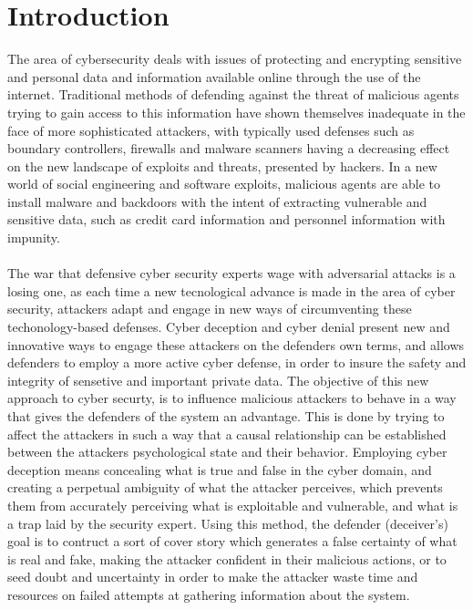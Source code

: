 \section{Introduction}
The area of cybersecurity deals with issues of protecting and encrypting sensitive and personal data and information available online through the use of the internet. Traditional methods of defending against the threat of malicious agents trying to gain access to this information have shown themselves inadequate in the face of more sophisticated attackers, with typically used defenses such as boundary controllers, firewalls and malware scanners having a decreasing effect on the new landscape of exploits and threats, presented by hackers. In a new world of social engineering and software exploits, malicious agents are able to install malware and backdoors with the intent of extracting vulnerable and sensitive data, such as credit card information and personnel information with impunity. \\\\
\noindent
The war that defensive cyber security experts wage with adversarial attacks is a losing one, as each time a new tecnological advance is made in the area of cyber security, attackers adapt and engage in new ways of circumventing these techonology-based defenses. Cyber deception and cyber denial present new and innovative ways to engage these attackers on the defenders own terms, and allows defenders to employ a more active cyber defense, in order to insure the safety and integrity of sensetive and important private data. The objective of this new approach to cyber securty, is to influence malicious attackers to behave in a way that gives the defenders of the system an advantage. This is done by trying to affect the attackers in such a way that a causal relationship can be established between the attackers psychological state and their behavior. Employing cyber deception means concealing what is true and false in the cyber domain, and creating a perpetual ambiguity of what the attacker perceives, which prevents them from accurately perceiving what is exploitable and vulnerable, and what is a trap laid by the security expert. Using this method, the defender (deceiver's) goal is to contruct a sort of cover story which generates a false certainty of what is real and fake, making the attacker confident in their malicious actions, or to seed doubt and uncertainty in order to make the attacker waste time and resources on failed attempts at gathering information about the system.   

